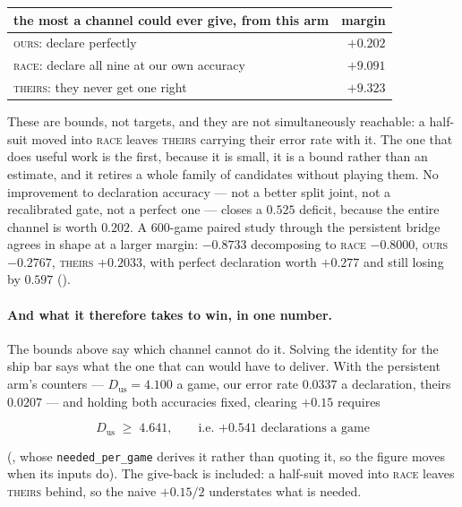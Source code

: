 \documentclass[11pt,letterpaper]{article}
\begin{document}
\begin{center}
\small
\begin{tabular}{lr}
\toprule
the most a channel could ever give, from this arm & margin \\
\midrule
\textsc{ours}: declare perfectly & $+0.202$ \\
\textsc{race}: declare all nine at our own accuracy & $+9.091$ \\
\textsc{theirs}: they never get one right & $+9.323$ \\
\bottomrule
\end{tabular}
\end{center}

\noindent These are bounds, not targets, and they are not simultaneously
reachable: a half-suit moved into \textsc{race} leaves \textsc{theirs}
carrying their error rate with it. The one that does useful work is the
first, because it is small, it is a bound rather than an estimate, and it
retires a whole family of candidates without playing them. No improvement to
declaration accuracy --- not a better split joint, not a recalibrated gate,
not a perfect one --- closes a $0.525$ deficit, because the entire channel is
worth $0.202$. A $600$-game paired study through the persistent bridge agrees
in shape at a larger margin: $-0.8733$ decomposing to \textsc{race}
$-0.8000$, \textsc{ours} $-0.2767$, \textsc{theirs} $+0.2033$, with perfect
declaration worth $+0.277$ and still losing by $0.597$
().

\paragraph{And what it therefore takes to win, in one number.} The bounds above
say which channel cannot do it. Solving the identity for the ship bar says what
the one that can would have to deliver. With the persistent arm's counters ---
$D_{\text{us}} = 4.100$ a game, our error rate $0.0337$ a declaration, theirs
$0.0207$ --- and holding both accuracies fixed, clearing $+0.15$ requires

\[
  D_{\text{us}} \;\ge\; \mathbf{4.641}, \qquad \text{i.e.\ }
  \mathbf{+0.541} \text{ declarations a game}
\]

\noindent (, whose
\texttt{needed\_per\_game} derives it rather than quoting it, so the figure moves
when its inputs do). The give-back is included: a half-suit moved into
\textsc{race} leaves \textsc{theirs} behind, so the naive $+0.15/2$ understates
what is needed.
\end{document}
